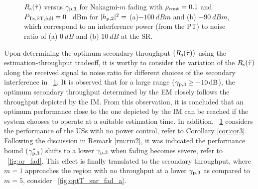 \begin{figure}[!ht]
{
\label{fig:optT_snr_fad_b}
}
\vspace{-2mm}
\caption{$R_{\text{s}}(\tilde{\tau})$ versus ${\gamma}_{\text{p,3}}$ for Nakagmi-$m$ fading with $\rho_{\text{cont}} = 0.1$ and $P_{\text{Tx,ST,full}} = 0$ \SI{}{dBm} for $|h_{\text{p,2}}|^2 =$ (a)$\SI{-100}{dBm}$ and (b) $ \SI{-90}{dBm}$, which correspond to an interference power (from the PT) to noise ratio of (a) $\SI{0}{dB}$ and (b) $\SI{10}{dB}$ at the SR.}
\label{fig:optT_snr_fad}
\end{figure}

Upon determining the optimum secondary throughput $(R_{\text{s}}(\tilde{\tau}))$ using the estimation-throughput tradeoff, it is worthy to consider the variation of the $R_{\text{s}}(\tilde{\tau})$ along the received signal to noise ratio for different choices of the secondary interference in \figurename~\ref{fig:optT_snr_fad}. It is observed that for a large range (${\gamma}_{\text{p,3}} \ge \SI{-10}{dB}$), the optimum secondary throughput determined by the EM closely follows the throughput depicted by the IM. From this observation, it is concluded that an optimum performance close to the one depicted by the IM can be reached if the system chooses to operate at a suitable estimation time. In addition, \figurename~\ref{fig:optT_snr_fad} considers the performance of the USs with no power control, refer to Corollary \ref{cor:cor3}. Following the discussion in Remark \ref{rm:rm2}, it was indicated the performance bound (${\gamma}_{\text{p,3}}^*$) shifts to a lower ${\gamma}_{\text{p,3}}$ when fading becomes severe, refer to \figurename~\ref{fig:or_fad}. This effect is finally translated to the secondary throughput, where $m = 1$ approaches the region with no throughput at a lower ${\gamma}_{\text{p,3}}$ as compared to $m = 5$, consider \figurename~\ref{fig:optT_snr_fad_a}. 
